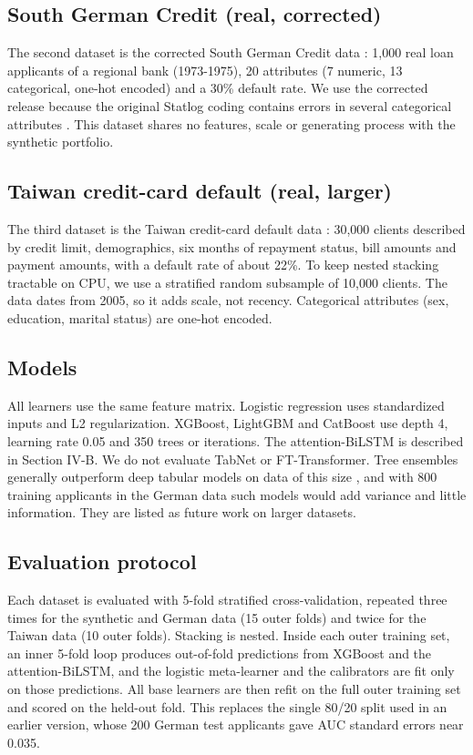 \documentclass[conference,a4paper]{IEEEtran}
\begin{document}
\subsection{South German Credit (real, corrected)}

The second dataset is the corrected South German Credit data \cite{r21}: 1,000 real loan applicants of a regional bank (1973-1975), 20 attributes (7 numeric, 13 categorical, one-hot encoded) and a 30\% default rate. We use the corrected release because the original Statlog coding contains errors in several categorical attributes \cite{r17,r22}. This dataset shares no features, scale or generating process with the synthetic portfolio.

\subsection{Taiwan credit-card default (real, larger)}

The third dataset is the Taiwan credit-card default data \cite{r31}: 30,000 clients described by credit limit, demographics, six months of repayment status, bill amounts and payment amounts, with a default rate of about 22\%. To keep nested stacking tractable on CPU, we use a stratified random subsample of 10,000 clients. The data dates from 2005, so it adds scale, not recency. Categorical attributes (sex, education, marital status) are one-hot encoded.

\subsection{Models}

All learners use the same feature matrix. Logistic regression uses standardized inputs and L2 regularization. XGBoost, LightGBM \cite{r23} and CatBoost \cite{r24} use depth 4, learning rate 0.05 and 350 trees or iterations. The attention-BiLSTM is described in Section IV-B. We do not evaluate TabNet or FT-Transformer. Tree ensembles generally outperform deep tabular models on data of this size \cite{r30}, and with 800 training applicants in the German data such models would add variance and little information. They are listed as future work on larger datasets.

\subsection{Evaluation protocol}

Each dataset is evaluated with 5-fold stratified cross-validation, repeated three times for the synthetic and German data (15 outer folds) and twice for the Taiwan data (10 outer folds). Stacking is nested. Inside each outer training set, an inner 5-fold loop produces out-of-fold predictions from XGBoost and the attention-BiLSTM, and the logistic meta-learner and the calibrators are fit only on those predictions. All base learners are then refit on the full outer training set and scored on the held-out fold. This replaces the single 80/20 split used in an earlier version, whose 200 German test applicants gave AUC standard errors near 0.035.
\end{document}

